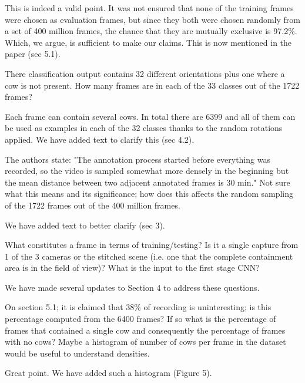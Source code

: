 \documentclass[10pt,a4paper]{letter}
\begin{document}
\begin{letter}{}
This is indeed a valid point. It was not ensured that none of the training frames were chosen as evaluation frames, but
since they both were chosen randomly from a set of 400 million frames, the
chance that they are mutually exclusive is 97.2\%. Which, we argue, is sufficient to make our claims. 
This is now mentioned in the paper (sec 5.1).

\begin{siderules}
There classification output contains 32 different orientations plus one where a cow is not present. How many frames are in each of the 33 classes 
out of the 1722 frames?
\end{siderules}

Each frame can contain several cows. In total there are 6399 and all of them
can be used as examples in each of the 32 classes thanks to the random
rotations applied. We have added text to clarify this (sec 4.2).

\begin{siderules}
The authors state: "The annotation process started before everything was recorded, so the video is sampled somewhat more densely in the beginning but 
the mean distance between two adjacent annotated frames is 30 min." Not sure what this means and its significance; how does this affects the random 
sampling of the 1722 frames out of the 400 million frames.
\end{siderules}

We have added text to better clarify (sec 3).

\begin{siderules}
What constitutes a frame in terms of training/testing? Is it a single capture from 1 of the 3 cameras or the stitched scene (i.e. one that the complete 
containment area is in the field of view)? What is the input to the first stage CNN?
\end{siderules}

We have made several updates to Section 4 to address these questions.

\begin{siderules}
On section 5.1; it is claimed that 38\% of recording is uninteresting; is this percentage computed from the 6400 frames? If so what is the percentage of 
frames that contained a single cow and consequently the percentage of frames with no cows? Maybe a histogram of number of cows per frame in the dataset 
would be useful to understand densities. 
\end{siderules}

Great point. We have added such a histogram (Figure 5).


\end{letter}
\end{document}
